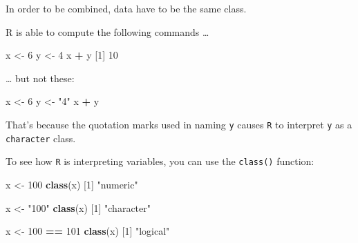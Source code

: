 \documentclass[
]{book}
\newenvironment{Shaded}{\begin{snugshade}}{\end{snugshade}}
\newcommand{\DecValTok}[1]{\textcolor[rgb]{0.00,0.00,0.81}{#1}}
\newcommand{\FunctionTok}[1]{\textcolor[rgb]{0.13,0.29,0.53}{\textbf{#1}}}
\newcommand{\NormalTok}[1]{#1}
\newcommand{\OtherTok}[1]{\textcolor[rgb]{0.56,0.35,0.01}{#1}}
\newcommand{\SpecialCharTok}[1]{\textcolor[rgb]{0.81,0.36,0.00}{\textbf{#1}}}
\newcommand{\StringTok}[1]{\textcolor[rgb]{0.31,0.60,0.02}{#1}}
\begin{document}
In order to be combined, data have to be the same class.

R is able to compute the following commands \ldots{}

\begin{Shaded}
\begin{Highlighting}[]
\NormalTok{x }\OtherTok{\textless{}{-}} \DecValTok{6}
\NormalTok{y }\OtherTok{\textless{}{-}} \DecValTok{4}
\NormalTok{x }\SpecialCharTok{+}\NormalTok{ y}
\NormalTok{[}\DecValTok{1}\NormalTok{] }\DecValTok{10}
\end{Highlighting}
\end{Shaded}

\ldots{} but not these:

\begin{Shaded}
\begin{Highlighting}[]
\NormalTok{x }\OtherTok{\textless{}{-}} \DecValTok{6}
\NormalTok{y }\OtherTok{\textless{}{-}} \StringTok{"4"}
\NormalTok{x }\SpecialCharTok{+}\NormalTok{ y}
\end{Highlighting}
\end{Shaded}

That's because the quotation marks used in naming \texttt{y} causes \texttt{R} to interpret \texttt{y} as a \texttt{character} class.

To see how \texttt{R} is interpreting variables, you can use the \texttt{class()} function:

\begin{Shaded}
\begin{Highlighting}[]
\NormalTok{x }\OtherTok{\textless{}{-}} \DecValTok{100}
\FunctionTok{class}\NormalTok{(x)}
\NormalTok{[}\DecValTok{1}\NormalTok{] }\StringTok{"numeric"}
\end{Highlighting}
\end{Shaded}

\begin{Shaded}
\begin{Highlighting}[]
\NormalTok{x }\OtherTok{\textless{}{-}} \StringTok{"100"}
\FunctionTok{class}\NormalTok{(x)}
\NormalTok{[}\DecValTok{1}\NormalTok{] }\StringTok{"character"}
\end{Highlighting}
\end{Shaded}

\begin{Shaded}
\begin{Highlighting}[]
\NormalTok{x }\OtherTok{\textless{}{-}} \DecValTok{100} \SpecialCharTok{==} \DecValTok{101}
\FunctionTok{class}\NormalTok{(x)}
\NormalTok{[}\DecValTok{1}\NormalTok{] }\StringTok{"logical"}
\end{Highlighting}
\end{Shaded}
\end{document}
